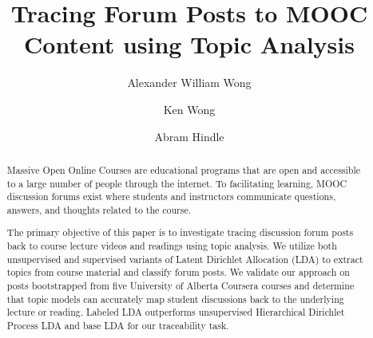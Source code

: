 \documentclass[sigconf, anonymous]{acmart}
\begin{document}
%
\title{Tracing Forum Posts to MOOC Content using Topic Analysis} %

%
\author{Alexander William Wong}

\author{Ken Wong}

\author{Abram Hindle}

%

\begin{abstract}
Massive Open Online Courses are educational programs that are open and accessible to a large number of people through the internet.
To facilitating learning, MOOC discussion forums exist where students and instructors communicate questions, answers, and thoughts related to the course.

The primary objective of this paper is to investigate tracing discussion forum posts back to course lecture videos and readings using topic analysis. We utilize both unsupervised and supervised variants of Latent Dirichlet Allocation (LDA) to extract topics from course material and classify forum posts.
We validate our approach on posts bootstrapped from five University of Alberta Coursera courses and determine that topic models can accurately map student discussions back to the underlying lecture or reading. Labeled LDA outperforms unsupervised Hierarchical Dirichlet Process LDA and base LDA for our traceability task.

\end{abstract}
\end{document}
